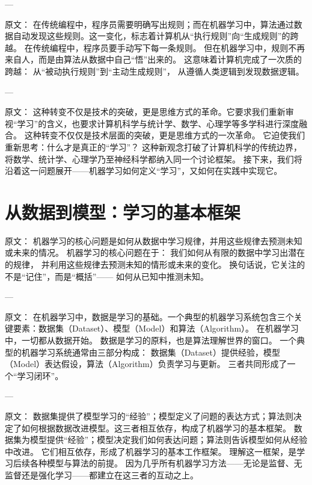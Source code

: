 ---

原文：
在传统编程中，程序员需要明确写出规则；而在机器学习中，算法通过数据自动发现这些规则。这一变化，标志着计算机从“执行规则”向“生成规则”的跨越。
在传统编程中，程序员要手动写下每一条规则。  
但在机器学习中，规则不再来自人，而是由算法从数据中自己“悟”出来的。  
这意味着计算机完成了一次质的跨越：  
从“被动执行规则”到“主动生成规则”，  
从遵循人类逻辑到发现数据逻辑。

---

原文：
这种转变不仅是技术的突破，更是思维方式的革命。它要求我们重新审视“学习”的含义，也要求计算机科学与统计学、数学、心理学等多学科进行深度融合。
这种转变不仅仅是技术层面的突破，更是思维方式的一次革命。  
它迫使我们重新思考：什么才是真正的“学习”？  
这种新观念打破了计算机科学的传统边界，  
将数学、统计学、心理学乃至神经科学都纳入同一个讨论框架。  
接下来，我们将沿着这一问题展开——机器学习如何定义“学习”，又如何在实践中实现它。

\section{从数据到模型：学习的基本框架}

原文：
机器学习的核心问题是如何从数据中学习规律，并用这些规律去预测未知或未来的情况。
机器学习的核心问题在于：  
我们如何从有限的数据中学习出潜在的规律，  
并利用这些规律去预测未知的情形或未来的变化。  
换句话说，它关注的不是“记住”，而是“概括”——  
如何从已知中推测未知。

---

原文：
在机器学习中，数据是学习的基础。一个典型的机器学习系统包含三个关键要素：数据集（Dataset）、模型（Model）和算法（Algorithm）。
在机器学习中，一切都从数据开始。  
数据是学习的原料，也是算法理解世界的窗口。  
一个典型的机器学习系统通常由三部分构成：  
数据集（Dataset）提供经验，模型（Model）表达假设，算法（Algorithm）负责学习与更新。  
三者共同形成了一个“学习闭环”。

---

原文：
数据集提供了模型学习的“经验”；模型定义了问题的表达方式；算法则决定了如何根据数据改进模型。这三者相互依存，构成了机器学习的基本框架。
数据集为模型提供“经验”；模型决定我们如何表达问题；算法则告诉模型如何从经验中改进。  
它们相互依存，形成了机器学习的基本工作框架。  
理解这一框架，是学习后续各种模型与算法的前提。  
因为几乎所有机器学习方法——无论是监督、无监督还是强化学习——都建立在这三者的互动之上。

